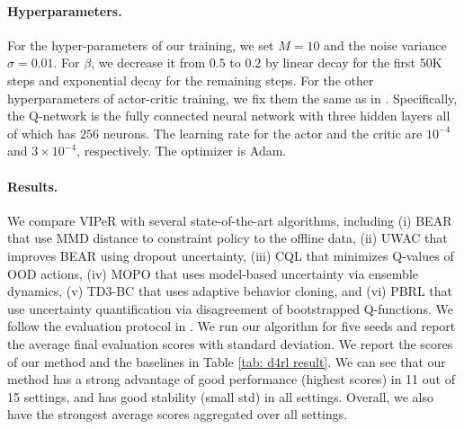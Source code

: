 \documentclass{article} \usepackage{iclr2023/iclr2023_conference,times}
\begin{document}
\paragraph{Hyperparameters.} For the hyper-parameters of our training, we set $M = 10$ and the noise variance $\sigma=0.01$. For $\beta$, we decrease it from $0.5$ to $0.2$ by linear decay for the first 50K steps and exponential decay for the remaining steps. For the other hyperparameters of actor-critic training, we fix them the same as in \cite{bai2022pessimistic}. Specifically, the Q-network is the fully connected neural network with three hidden layers all of which has $256$ neurons. The learning rate for the actor and the critic are $10^{-4}$ and $3 \times 10^{-4}$, respectively. The optimizer is Adam. 

\paragraph{Results.} We compare VIPeR with several state-of-the-art algorithms, including (i) BEAR \citep{DBLP:conf/nips/KumarFSTL19} that use MMD distance to constraint policy to the offline data, (ii) UWAC \citep{DBLP:conf/icml/0001ZSSZSG21} that improves BEAR using dropout uncertainty, (iii) CQL \citep{DBLP:conf/nips/KumarZTL20} that minimizes Q-values of OOD actions, (iv) MOPO \citep{DBLP:conf/nips/YuTYEZLFM20} that uses model-based uncertainty via ensemble dynamics, (v) TD3-BC \citep{DBLP:conf/nips/FujimotoG21} that uses adaptive behavior cloning, and (vi) PBRL \citep{bai2022pessimistic} that use uncertainty quantification via disagreement of bootstrapped Q-functions. We follow the evaluation protocol in \cite{bai2022pessimistic}. We run our algorithm for five seeds and report the average final evaluation scores with standard deviation. We report the scores of our method and the baselines in Table \ref{tab: d4rl result}. We can see that our method has a strong advantage of good performance (highest scores) in 11 out of 15 settings, and has good stability (small std) in all settings. Overall, we also have the strongest average scores aggregated over all settings. 
\end{document}
